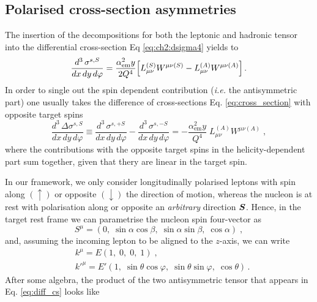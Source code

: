 \subsection{Polarised cross-section asymmetries}
The insertion of the decompositions for both the leptonic and hadronic tensor into the differential cross-section Eq \eqref{eq:ch2:dsigma4} yields to 
\begin{equation}
  \frac{d^3 \, \sigma^{s,S}}{dx \, dy \, d\varphi} = \frac{\alpha_{\textrm{em}}^2 y}{2 Q^4} \Bigl[ L^{(S)}_{\mu\nu} W^{\mu\nu(S)} - L^{(A)}_{\mu\nu} W^{\mu\nu(A)}  \Bigr]\,.
  \label{eq:cross_section}
\end{equation}
In order to single out the spin dependent contribution (\textit{i.e.} the antisymmetric part) one usually takes the difference of cross-sections Eq. \eqref{eq:cross_section} with opposite target spins 
\begin{equation}
  \frac{d^3 \, \Delta \sigma^{s,S}}{dx \, dy \, d\varphi} \equiv \frac{d^3 \, \sigma^{s,+S}}{dx \, dy \, d\varphi} - \frac{d^3 \, \sigma^{s,-S}}{dx \, dy \, d\varphi} = - \frac{\alpha_{\textrm{em}}^2 y}{Q^4} \; L^{(A)}_{\mu\nu} W^{\mu\nu(A)} \;,
  \label{eq:diff_cs}
\end{equation}
where the contributions with the opposite target spins in the helicity-dependent part sum together, given that thery are linear in the target spin.\par
In our framework, we only consider longitudinally polarised leptons with spin along $(\uparrow)$ or opposite $(\downarrow)$ the direction of motion, whereas the nucleon is at rest with polarisation along or opposite an \textit{arbitrary} direction $\vb*{S}$. Hence, in the target rest frame we can parametrise the nucleon spin four-vector as
\begin{equation}
  S^{\mu} = (0, \; \sin \alpha \cos\beta, \; \sin \alpha \sin \beta, \; \cos \alpha) \;,
  \label{eq:par_S}
\end{equation}
and, assuming the incoming lepton to be aligned to the $z$-axis, we can write
\begin{equation}
  \begin{split}
    & k^{\mu} = E (1,\; 0,\; 0,\; 1)\;, \\
    & k'^{\mu} = E'( 1,\; \sin\theta \cos \varphi,\; \sin\theta \sin \varphi, \; \cos \theta )\,.
    \label{eq:par_k}
  \end{split}
\end{equation} 
After some algebra, the product of the two antisymmetric tensor that appears in Eq. \eqref{eq:diff_cs} looks like 
